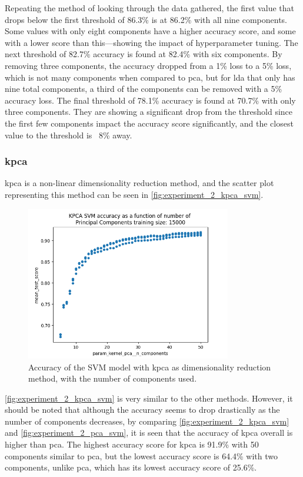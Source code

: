 Repeating the method of looking through the data gathered, the first value that drops below the first threshold of 86.3\% is at 86.2\% with all nine components. Some values with only eight components have a higher accuracy score, and some with a lower score than this—showing the impact of hyperparameter tuning.
The next threshold of 82.7\% accuracy is found at 82.4\% with six components. By removing three components, the accuracy dropped from a 1\% loss to a 5\% loss, which is not many components when compared to \gls{pca}, but for \gls{lda} that only has nine total components, a third of the components can be removed with a 5\% accuracy loss.
The final threshold of 78.1\% accuracy is found at 70.7\% with only three components. They are showing a significant drop from the threshold since the first few components impact the accuracy score significantly, and the closest value to the threshold is ~8\% away.


\subsubsection{\gls{kpca}}\label{subsubsec:experiment_2_kpca}
\gls{kpca} is a non-linear dimensionality reduction method, and the scatter plot representing this method can be seen in \autoref{fig:experiment_2_kpca_svm}.

\begin{figure}[htb!]
    \centering
    \includegraphics[width=0.8\textwidth]{figures/experiment_two/kpca_svm_15000.png}
    \caption{Accuracy of the SVM model with \gls{kpca} as dimensionality reduction method, with the number of components used.}
    \label{fig:experiment_2_kpca_svm}
\end{figure}

\autoref{fig:experiment_2_kpca_svm} is very similar to the other methods. However, it should be noted that although the accuracy seems to drop drastically as the number of components decreases, by comparing \autoref{fig:experiment_2_kpca_svm} and \autoref{fig:experiment_2_pca_svm}, it is seen that the accuracy of \gls{kpca} overall is higher than \gls{pca}. The highest accuracy score for \gls{kpca} is 91.9\% with 50 components similar to \gls{pca}, but the lowest accuracy score is 64.4\% with two components, unlike \gls{pca}, which has its lowest accuracy score of 25.6\%.

